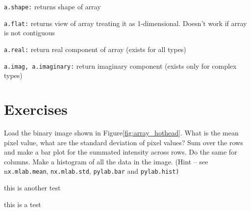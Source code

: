 \begin{description}
\begin{spacing}{0.50}
\item [{\texttt{a.shape:}}] returns shape of array
\item [{\texttt{a.flat:}}] returns view of array treating it as 1-dimensional.
Doesn't work if array is not contiguous
\item [{\texttt{a.real:}}] return real component of array (exists for all
types)
\item [{\texttt{a.imag,~a.imaginary:}}] return imaginary component (exists
only for complex types)\end{spacing}

\end{description}

\section{Exercises}

\begin{xca}
Load the binary image shown in Figure\ref{fig:array_hothead}. What
is the mean pixel value, what are the standard deviation of pixel
values? Sum over the rows and make a bar plot for the summated intensity
across rows. Do the same for columns. Make a histogram of all the
data in the image. (Hint -- see n\texttt{x.mlab.mean}, \texttt{nx.mlab.std},
\texttt{pylab.bar} and \texttt{pylab.hist)}
\end{xca}
\begin{example}
this is another test
\end{example}
this is a test
